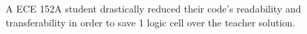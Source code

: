 
\begin{figure}[t]
    \centering
    \inputminted[frame=single]{systemverilog}{media/code/unreadable_opt.svh}
    \caption[
        Code optimized at expense of readability
    ]{
        A ECE 152A student drastically reduced their code's readability and transferability in order to save 1 logic cell over the teacher solution.
    }
    \label{fig:unreadable_opt}
\end{figure}
